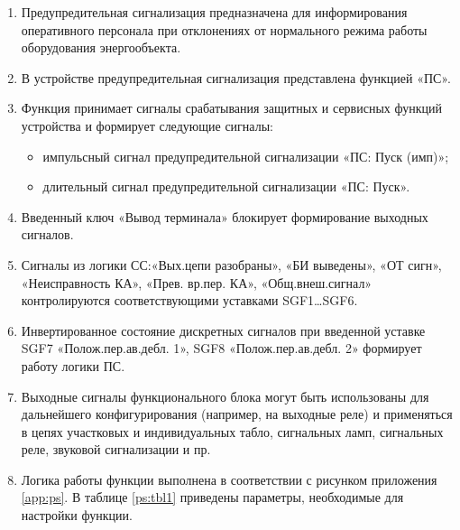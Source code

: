 
\color{black}

\begin{enumerate}[label=\arabic{section}.\arabic{subsection}.\arabic*, labelsep=4pt, leftmargin=0pt, itemindent=57pt]

\item	
Предупредительная сигнализация предназначена для информирования оперативного персонала при отклонениях от нормального режима работы оборудования энергообъекта.

\item
В устройстве предупредительная сигнализация представлена функцией «ПС».

\item
Функция принимает сигналы срабатывания защитных и сервисных функций устройства и формирует следующие сигналы:
\begin{itemize}
	\item импульсный сигнал предупредительной сигнализации «ПС: Пуск (имп)»;
	\item длительный сигнал предупредительной сигнализации «ПС: Пуск».
\end{itemize}

\item
Введенный ключ «Вывод терминала» блокирует формирование выходных сигналов.

\item
Сигналы из логики СС:«Вых.цепи разобраны», «БИ выведены», «ОТ сигн», «Неисправность КА», «Прев. вр.пер. КА», «Общ.внеш.сигнал» контролируются соответствующими уставками SGF1\ldots SGF6.

\item
Инвертированное состояние дискретных сигналов при введенной уставке SGF7 «Полож.пер.ав.дебл. 1», SGF8 «Полож.пер.ав.дебл. 2»  формирует работу логики ПС.

\item
Выходные сигналы функционального блока могут быть использованы для дальнейшего конфигурирования (например, на выходные реле) и применяться в цепях участковых и индивидуальных табло, сигнальных ламп, сигнальных реле, звуковой сигнализации и пр.

\item
Логика работы функции выполнена в соответствии с рисунком приложения \ref{app:ps}. В таблице \ref{ps:tbl1} приведены параметры, необходимые для настройки функции. 

\end{enumerate}